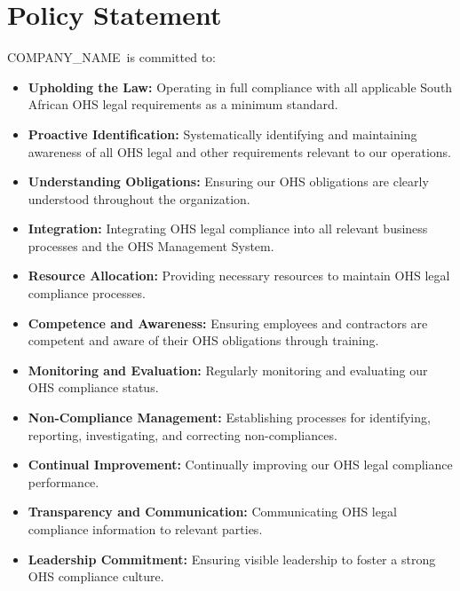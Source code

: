 \documentclass[11pt]{article}
\newcommand{\clientName}{{{COMPANY_NAME}}}
\begin{document}
\section{Policy Statement}
\clientName\ is committed to:
\begin{itemize}
    \item \textbf{Upholding the Law:} Operating in full compliance with all applicable South African OHS legal requirements as a minimum standard.
    \item \textbf{Proactive Identification:} Systematically identifying and maintaining awareness of all OHS legal and other requirements relevant to our operations.
    \item \textbf{Understanding Obligations:} Ensuring our OHS obligations are clearly understood throughout the organization.
    \item \textbf{Integration:} Integrating OHS legal compliance into all relevant business processes and the OHS Management System.
    \item \textbf{Resource Allocation:} Providing necessary resources to maintain OHS legal compliance processes.
    \item \textbf{Competence and Awareness:} Ensuring employees and contractors are competent and aware of their OHS obligations through training.
    \item \textbf{Monitoring and Evaluation:} Regularly monitoring and evaluating our OHS compliance status.
    \item \textbf{Non-Compliance Management:} Establishing processes for identifying, reporting, investigating, and correcting non-compliances.
    \item \textbf{Continual Improvement:} Continually improving our OHS legal compliance performance.
    \item \textbf{Transparency and Communication:} Communicating OHS legal compliance information to relevant parties.
    \item \textbf{Leadership Commitment:} Ensuring visible leadership to foster a strong OHS compliance culture.
\end{itemize}
\end{document}
